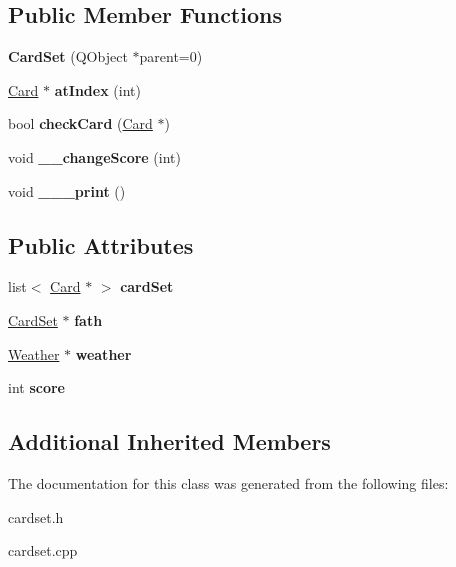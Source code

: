 \subsection*{Public Member Functions}
\begin{DoxyCompactItemize}
\item 
\mbox{\label{class_card_set_ab71f7d1a3ff84bbe38a15a9f3763cc51}} 
{\bfseries Card\+Set} (Q\+Object $\ast$parent=0)
\item 
\mbox{\label{class_card_set_aa1bc47338af30630e2bf531efbe0cf56}} 
\hyperlink{class_card}{Card} $\ast$ {\bfseries at\+Index} (int)
\item 
\mbox{\label{class_card_set_aaeac4f9e1a5560457653f42416721459}} 
bool {\bfseries check\+Card} (\hyperlink{class_card}{Card} $\ast$)
\item 
\mbox{\label{class_card_set_a5869ddf6190c03ce3bc5ce77139708e4}} 
void {\bfseries \+\_\+\+\_\+change\+Score} (int)
\item 
\mbox{\label{class_card_set_ab025d30be863978e10536c97874fbbe5}} 
void {\bfseries \+\_\+\+\_\+\+\_\+print} ()
\end{DoxyCompactItemize}
\subsection*{Public Attributes}
\begin{DoxyCompactItemize}
\item 
\mbox{\label{class_card_set_a1edd225de05154f8feafc2afab4dd22b}} 
list$<$ \hyperlink{class_card}{Card} $\ast$ $>$ {\bfseries card\+Set}
\item 
\mbox{\label{class_card_set_ad216ddc2e60b7e83c8bd3ab35d22cde0}} 
\hyperlink{class_card_set}{Card\+Set} $\ast$ {\bfseries fath}
\item 
\mbox{\label{class_card_set_a04ee7f62a134fee4c15199eec78614d8}} 
\hyperlink{class_weather}{Weather} $\ast$ {\bfseries weather}
\item 
\mbox{\label{class_card_set_aa46653ada53e7a80af71309a8a93cc3e}} 
int {\bfseries score}
\end{DoxyCompactItemize}
\subsection*{Additional Inherited Members}


The documentation for this class was generated from the following files\+:\begin{DoxyCompactItemize}
\item 
cardset.\+h\item 
cardset.\+cpp\end{DoxyCompactItemize}
